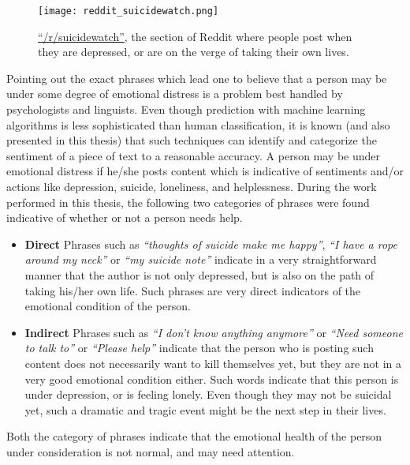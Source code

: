 \begin{figure}[t!]
    \centering
    \texttt{[image: reddit\_suicidewatch.png]}
    \caption{\href{http://www.reddit.com/r/suicidewatch}{``/r/suicidewatch''}, the section of Reddit \cite{reddit} where people post when they are depressed, or are on the verge of taking their own lives.}
    \label{fig:reddit_suicidewatch}
\end{figure}

Pointing out the exact phrases which lead one to believe that a person may be under some degree of emotional distress is a problem best handled by psychologists and linguists. Even though prediction with machine learning algorithms is less sophisticated than human classification, it is known (and also presented in this thesis) that such techniques can identify and categorize the sentiment of a piece of text to a reasonable accuracy. A person may be under emotional distress if he/she posts content which is indicative of sentiments and/or actions like depression, suicide, loneliness, and helplessness. During the work performed in this thesis, the following two categories of phrases were found indicative of whether or not a person needs help.

\begin{itemize}
    \item{\textbf{Direct} Phrases such as \emph{``thoughts of suicide make me happy''}, \emph{``I have a rope around my neck''} or \emph{``my suicide note''} indicate in a very straightforward manner that the author is not only depressed, but is also on the path of taking his/her own life. Such phrases are very direct indicators of the emotional condition of the person.}
    \item{\textbf{Indirect} Phrases such as \emph{``I don't know anything anymore''} or \emph{``Need someone to talk to''} or \emph{``Please help''} indicate that the person who is posting such content does not necessarily want to kill themselves yet, but they are not in a very good emotional condition either. Such words indicate that this person is under depression, or is feeling lonely. Even though they may not be suicidal yet, such a dramatic and tragic event might be the next step in their lives.}
\end{itemize}

Both the category of phrases indicate that the emotional health of the person under consideration is not normal, and may need attention.\\

